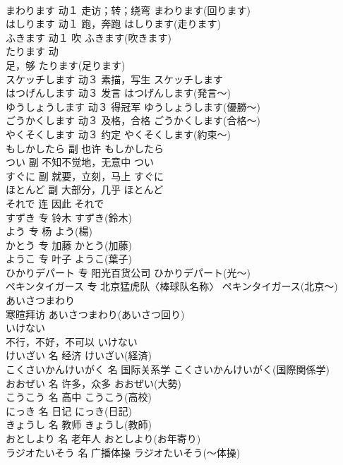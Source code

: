 \documentclass[8pt]{extreport}
\begin{document}
\begin{CJK}{UTF8}{min}
\\	まわります	动１	走访；转；绕弯	まわります(回ります)	
\\	はしります	动１	跑，奔跑	はしります(走ります)	
\\	ふきます	动１	吹	ふきます(吹きます)	
\\	たります	动 
\\	足，够	たります(足ります)	
\\	スケッチします	动３	素描，写生	スケッチします	
\\	はつげんします	动３	发言	はつげんします(発言～)	
\\	ゆうしょうします	动３	得冠军	ゆうしょうします(優勝～)	
\\	ごうかくします	动３	及格，合格	ごうかくします(合格～)	
\\	やくそくします	动３	约定	やくそくします(約束～)	
\\	もしかしたら	副	也许	もしかしたら	
\\	つい	副	不知不觉地，无意中	つい	
\\	すぐに	副	就要，立刻，马上	すぐに	
\\	ほとんど	副	大部分，几乎	ほとんど	
\\	それで	连	因此	それで	
\\	すずき	专	铃木	すずき(鈴木)	
\\	よう	专	杨	よう(楊)	
\\	かとう	专	加藤	かとう(加藤)	
\\	ようこ	专	叶子	ようこ(葉子)	
\\	ひかりデパート	专	阳光百货公司	ひかりデパート(光～)	
\\	ペキンタイガース	专	北京猛虎队〈棒球队名称〉	ペキンタイガース(北京～)	
\\	あいさつまわり	
\\	寒暄拜访	あいさつまわり(あいさつ回り)	
\\	いけない	
\\	不行，不好，不可以	いけない	
\\	けいざい	名	经济	けいざい(経済)	
\\	こくさいかんけいがく	名	国际关系学	こくさいかんけいがく(国際関係学)	
\\	おおぜい	名	许多，众多	おおぜい(大勢)	
\\	こうこう	名	高中	こうこう(高校)	
\\	にっき	名	日记	にっき(日記)	
\\	きょうし	名	教师	きょうし(教師)	
\\	おとしより	名	老年人	おとしより(お年寄り)	
\\	ラジオたいそう	名	广播体操	ラジオたいそう(～体操)	

\end{CJK}
\end{document}
